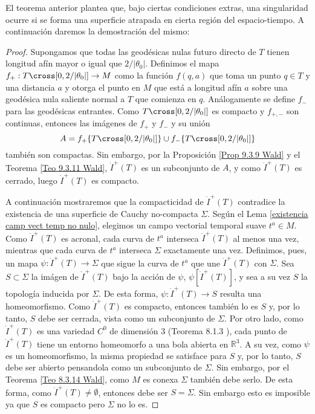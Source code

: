 El teorema anterior plantea que, bajo ciertas condiciones extras, una singularidad ocurre si se forma una superficie atrapada en cierta región del espacio-tiempo. A continuación daremos la demostración del mismo:

\begin{proof}
Supongamos que todas las geodésicas nulas futuro directo de $T$ tienen longitud afín mayor o igual que $2/|\theta_0|$. Definimos el mapa $f_+:T\cross[0,2/|\theta_0|]\rightarrow M$ como la función $f(q,a)$ que toma un punto $q\in T$ y una distancia $a$ y otorga el punto en $M$ que está a longitud afín $a$ sobre una geodésica nula saliente normal a $T$ que comienza en $q$. Análogamente se define $f_-$ para las geodésicas entrantes. Como $T\cross[0,2/|\theta_0|]$ es compacto y $f_{+,-}$ son continuas, entonces las imágenes de $f_+$ y $f_-$ y su unión 
$$
A=f_+\{T\cross[0,2/|\theta_0|]\} \cup f_-\{T\cross[0,2/|\theta_0|]\}
$$
también son compactas. Sin embargo, por la Proposición \ref{Prop 9.3.9 Wald} y el Teorema \ref{Teo 9.3.11 Wald}, $\dot{I}^+(T)$ es un subconjunto de $A$, y como $\dot{I}^+(T)$ es cerrado, luego $\dot{I}^+(T)$ es compacto.

A continuación mostraremos que la compacticidad de $\dot{I}^+(T)$ contradice la existencia de una superficie de Cauchy no-compacta $\Sigma$. Según el Lema \ref{existencia camp vect temp no nulo}, elegimos un campo vectorial temporal suave $t^a\in M$. Como $\dot{I}^+(T)$ es acronal, cada curva de $t^a$ interseca $\dot{I}^+(T)$ al menos una vez, mientras que cada curva de $t^a$ interseca $\Sigma$ exactamente una vez. Definimos, pues, un mapa $\psi:\dot{I}^+(T)\rightarrow \Sigma$ que sigue la curva de $t^a$ que une $\dot{I}^+(T)$ con $\Sigma$. Sea $S\subset \Sigma$ la imágen de $\dot{I}^+(T)$ bajo la acción de $\psi$, $\psi[\dot{I}^+(T)]$, y sea a su vez $S$ la topología inducida por $\Sigma$. De esta forma, $\psi: \dot{I}^+(T)\rightarrow S$ resulta una homeomorfismo. Como $\dot{I}^+(T)$ es compacto, entonces también lo es $S$ y, por lo tanto, $S$ debe ser cerrada, vista como un subconjunto de $\Sigma$. Por otro lado, como $\dot{I}^+(T)$ es una variedad $C^0$ de dimensión 3 (Teorema 8.1.3 \citep{1984ucp..book.....W}), cada punto de $\dot{I}^+(T)$ tiene un entorno homeomorfo a una bola abierta en $\mathbb{R}^3$. A su vez, como $\psi$ es un homeomorfismo, la misma propiedad se satisface para $S$ y, por lo tanto, $S$ debe ser abierto pensandola como un subconjunto de $\Sigma$. Sin embargo, por el Teorema \ref{Teo 8.3.14 Wald}, como $M$ es conexa $\Sigma$ también debe serlo. De esta forma, como $\dot{I}^+(T)\neq \emptyset$, entonces debe ser $S=\Sigma$. Sin embargo esto es imposible ya que $S$ es compacto pero $\Sigma$ no lo es. 
\end{proof}



